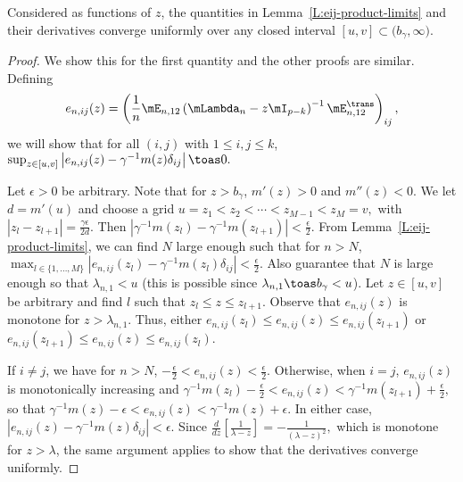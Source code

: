 \begin{lemma}\label{L:eij-product-limits-uniform}
    Considered as functions of $z$, the quantities in 
    Lemma~\ref{L:eij-product-limits} and their derivatives
    converge uniformly over any closed
    interval $[u,v] \subset \big( b_\gamma,\infty \big)$.
\end{lemma}
\begin{proof}
    We show this for the first quantity and the other proofs are similar.
    Defining
    \[
        e_{n,ij}(z)
        =
        \left(
            \frac{1}{n}
            \mE_{n,12}
            \left(
                \mLambda_n - z \mI_{p-k}
            \right)^{-1}
            \mE_{n,12}^\trans
        \right)_{ij},
    \]
    we will show that for all $(i,j)$ with $1 \leq i,j \leq k$, 
    \(
        \sup_{z \in [u,v]} 
            \left|
                e_{n,ij}(z)
                    -
                    \gamma^{-1}
                    m(z)
                    \delta_{ij}
            \right|
            \toas 0.
    \)
    
    Let $\epsilon > 0$ be arbitrary.  Note that for 
    $z > b_\gamma$, $m'(z) > 0$ and $m''(z) < 0$.  We let $d = m'(u)$ and
    choose a grid
    \(
        u = z_1 < z_2 < \cdots < z_{M-1} < z_M = v,
    \)
    with $|z_l - z_{l+1}| = \frac{\gamma \epsilon}{2 d}$.  
    Then $|\gamma^{-1} m(z_l) - \gamma^{-1} m(z_{l+1})| < \frac{\epsilon}{2}$.  
    From 
    Lemma~\ref{L:eij-product-limits}, we can find $N$ large enough such
    that for $n > N$, 
    \(
        \max_{l\in\{1, \ldots, M\}}
            \left|
                e_{n,ij}(z_l)
                    -
                    \gamma^{-1}
                    m(z_l)
                    \delta_{ij}
            \right|
            <
            \frac{\epsilon}{2}.
    \)
    Also guarantee that $N$ is large enough so that $\lambda_{n,1} < u$ 
    (this is possible since $\lambda_{n,1} \toas b_\gamma < u$).
    Let $z \in [u,v]$ be arbitrary and find $l$ such that 
    $z_l \leq z \leq z_{l+1}$.
    Observe that $e_{n,ij}(z)$ is monotone for $z > \lambda_{n,1}$.  Thus,
    either
    \(
        e_{n,ij}(z_l) \leq e_{n,ij}(z) \leq e_{n,ij}(z_{l+1})
    \)
    or
    \(
        e_{n,ij}(z_{l+1}) \leq e_{n,ij}(z) \leq e_{n,ij}(z_{l}).
    \)
    
    If $i \neq j$, we have for $n > N$,
    \(
        -\frac{\epsilon}{2} < e_{n,ij}(z) < \frac{\epsilon}{2}.
    \)
    Otherwise, when $i = j$, $e_{n,ij}(z)$ is 
    monotonically increasing and
    \(
        \gamma^{-1} m(z_l) - \frac{\epsilon}{2}
            <
                e_{n,ij}(z)
                    <
                        \gamma^{-1} m(z_{l+1}) + \frac{\epsilon}{2},
    \)
    so that
    \(
        \gamma^{-1} m(z) - \epsilon
            <
                e_{n,ij}(z)
                    <
                        \gamma^{-1} m(z) + \epsilon.
    \)
    In either case, 
    $|e_{n,ij}(z) - \gamma^{-1} m(z) \delta_{ij}| < \epsilon$.
    Since 
    \(
        \frac{d}{dz} \left[
            \frac{1}{\lambda - z}
        \right]
            =
            -\frac{1}{(\lambda - z)^{2}},
    \)
    which is monotone for $z > \lambda$, the same argument applies to show
    that the derivatives converge uniformly.
\end{proof}


